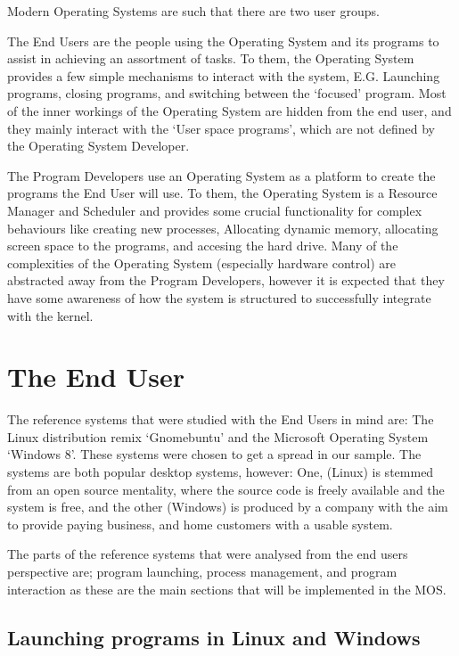 \documentclass[a4paper]{report}
\begin{document}
Modern Operating Systems are such that there are two user groups.


The End Users are the people using the Operating System and its programs to assist in achieving an assortment of tasks. To them, the Operating System provides a few simple mechanisms to interact with the system, E.G. Launching programs, closing programs, and switching between the `focused' program. Most of the inner workings of the Operating System are hidden from the end user, and they mainly interact with the `User space programs', which are not defined by the Operating System Developer.


The Program Developers use an Operating System as a platform to create the programs the End User will use. To them, the Operating System is a Resource Manager and Scheduler and provides some crucial functionality for complex behaviours like creating new processes, Allocating dynamic memory, allocating screen space to the programs, and accesing the hard drive. Many of the complexities of the Operating System (especially hardware control) are abstracted away from the Program Developers, however it is expected that they have some awareness of how the system is structured to successfully integrate with the kernel.






\clearpage
\section{The End User}
The reference systems that were studied with the End Users in mind are: The Linux distribution remix `Gnomebuntu' and the Microsoft Operating System `Windows 8'. These systems were chosen to get a spread in our sample. The systems are both popular desktop systems, however: One, (Linux) is stemmed from an open source mentality, where the source code is freely available and the system is free, and the other (Windows) is produced by a company with the aim to provide paying business, and home customers with a usable system.

The parts of the reference systems that were analysed from the end users perspective are; program launching, process management, and program interaction as these are the main sections that will be implemented in the MOS.

\subsection{Launching programs in Linux and Windows}
\end{document}
